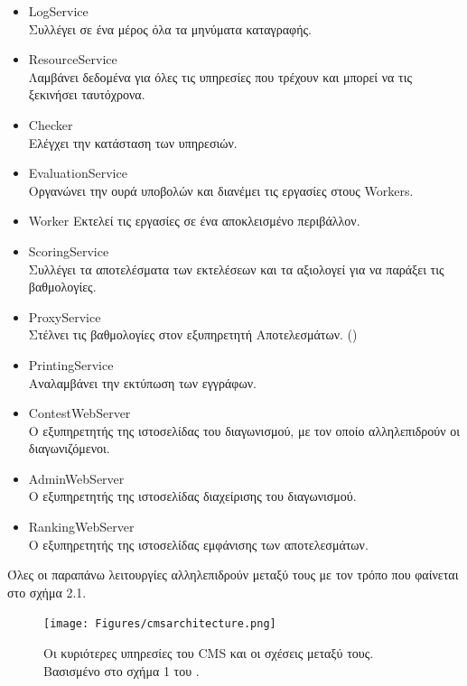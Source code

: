 \documentclass[diploma]{softlab-thesis}
\begin{document}
\begin{itemize}
    \setlength\itemsep{0em}
    \item LogService \\
      Συλλέγει σε ένα μέρος όλα τα μηνύματα καταγραφής.
    \item ResourceService \\
      Λαμβάνει δεδομένα για όλες τις υπηρεσίες που τρέχουν και μπορεί να τις
      ξεκινήσει ταυτόχρονα.
    \item Checker \\
      Ελέγχει την κατάσταση των υπηρεσιών.
    \item EvaluationService \\
      Οργανώνει την ουρά υποβολών και διανέμει τις εργασίες στους Workers.
    \item Worker
      Εκτελεί τις εργασίες σε ένα αποκλεισμένο περιβάλλον.
    \item ScoringService \\
      Συλλέγει τα αποτελέσματα των εκτελέσεων και τα αξιολογεί για να παράξει
      τις βαθμολογίες.
    \item ProxyService \\
      Στέλνει τις βαθμολογίες στον εξυπηρετητή Αποτελεσμάτων.
      (\cite{maggiolo2014cms})
    \item PrintingService \\
      Αναλαμβάνει την εκτύπωση των εγγράφων.
    \item ContestWebServer \\
      Ο εξυπηρετητής της ιστοσελίδας του διαγωνισμού, με τον οποίο αλληλεπιδρούν
      οι διαγωνιζόμενοι.
    \item AdminWebServer \\
      Ο εξυπηρετητής της ιστοσελίδας διαχείρισης του διαγωνισμού.
    \item RankingWebServer \\
      Ο εξυπηρετητής της ιστοσελίδας εμφάνισης των αποτελεσμάτων.
\end{itemize}

\bigskip

Όλες οι παραπάνω λειτουργίες αλληλεπιδρούν μεταξύ τους με τον τρόπο που φαίνεται
στο σχήμα 2.1.

\begin{figure}
  \centering
  \texttt{[image: Figures/cmsarchitecture.png]}
  \caption[Η αρχιτεκτονική του CMS]{Οι κυριότερες υπηρεσίες του CMS και οι
  σχέσεις μεταξύ τους. Βασισμένο στο σχήμα 1 του
  \cite{maggiolo2012introducing}.}
\end{figure}
\end{document}
